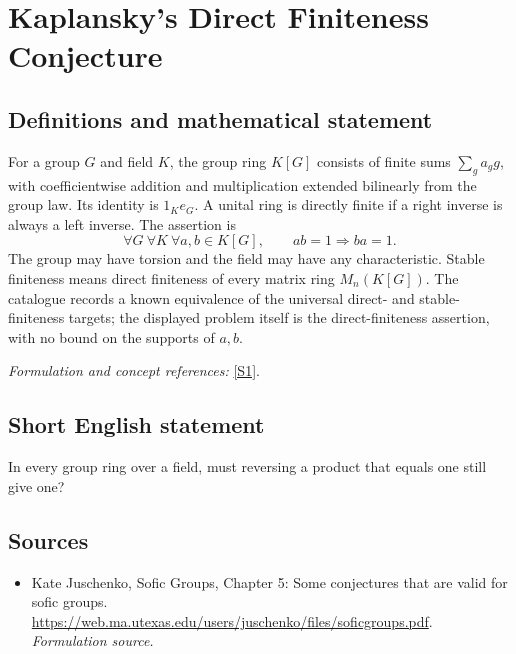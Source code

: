 \documentclass[11pt]{article}
\begin{document}
\section*{\texorpdfstring{Kaplansky's Direct Finiteness Conjecture}{Kaplansky's Direct Finiteness Conjecture}}\label{440}
\subsection{Definitions and mathematical statement}
For a group $G$ and field $K$, the group ring $K[G]$ consists of finite sums $\sum_g a_g g$, with coefficientwise addition and multiplication extended bilinearly from the group law. Its identity is $1_K e_G$. A unital ring is directly finite if a right inverse is always a left inverse. The assertion is
\[
 \forall G\ \forall K\ \forall a,b\in K[G],
 \qquad ab=1\Longrightarrow ba=1.
\]
The group may have torsion and the field may have any characteristic. Stable finiteness means direct finiteness of every matrix ring $M_n(K[G])$. The catalogue records a known equivalence of the universal direct- and stable-finiteness targets; the displayed problem itself is the direct-finiteness assertion, with no bound on the supports of $a,b$.
\par\smallskip\textit{Formulation and concept references:} \href{https://web.ma.utexas.edu/users/juschenko/files/soficgroups.pdf}{[S1]}.

\subsection{Short English statement}
In every group ring over a field, must reversing a product that equals one still give one?
\subsection{Sources}
\begin{itemize}
\item[S1]Kate Juschenko, Sofic Groups, Chapter 5: Some conjectures that are valid for sofic groups.
\url{https://web.ma.utexas.edu/users/juschenko/files/soficgroups.pdf}.
\textit{Formulation source.}
\end{itemize}
\end{document}
